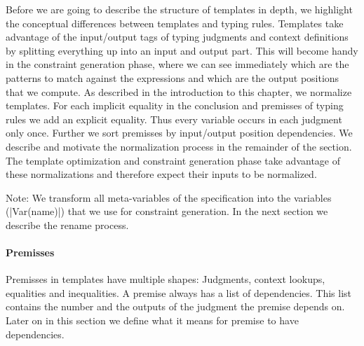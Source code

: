 Before we are going to describe the structure of templates in depth,
we highlight the conceptual differences between templates and typing
rules. Templates take advantage of the input/output tags of typing
judgments and context definitions by splitting everything up into an
input and output part. This will become handy in the constraint
generation phase, where we can see immediately which are the patterns
to match against the expressions and which are the output positions
that we compute. As described in the introduction to this chapter, we
normalize templates. For each implicit equality in the conclusion and
premisses of typing rules we add an explicit equality. Thus every
variable occurs in each judgment only once. Further we sort premisses
by input/output position dependencies. We describe and motivate the
normalization process in the remainder of the section. The template
optimization and constraint generation phase take advantage of these
normalizations and therefore expect their inputs to be normalized.

Note: We transform all meta-variables of the specification into the
variables (\code|Var(name)|) that we use for constraint generation. In
the next section we describe the rename process.

\paragraph*{Premisses}
Premisses in templates have multiple shapes: Judgments, context
lookups, equalities and inequalities. A premise always has a list of
dependencies. This list contains the number and the outputs of the
judgment the premise depends on. Later on in this section we define
what it means for premise to have dependencies.

